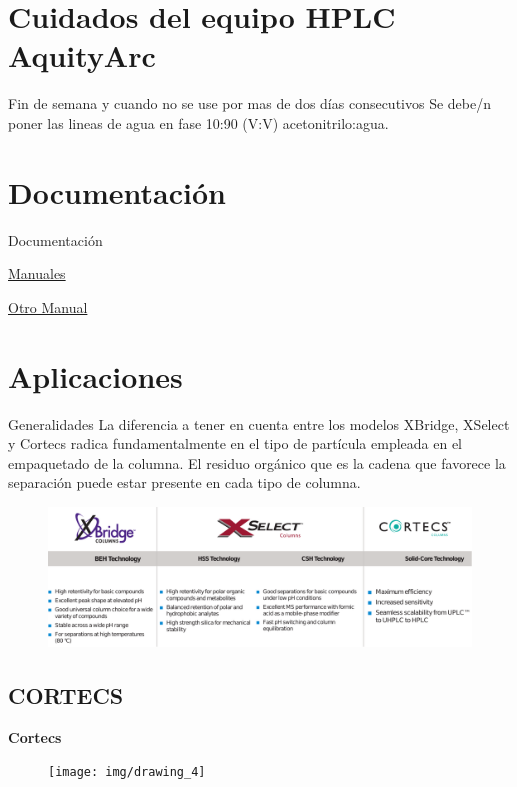 \documentclass[11pt]{beamer}
\begin{document}
    \section{Cuidados del equipo HPLC AquityArc}
      \begin{frame}{Fin de semana y cuando no se use por mas de dos días consecutivos}
          Se debe/n poner las lineas de agua en fase 10:90 (V:V) acetonitrilo:agua.
      \end{frame}

    \section{Documentación}
      \begin{frame}{Documentación}

        \href{https://www.manualsdir.com/brands/waters/129.html}{Manuales}

        \href{https://www.waters.com/waters/support.htm?locale=es\_EC\&lid=134658708\&cid=511442\&type=USRM}{Otro Manual}


      \end{frame}
    \section{Aplicaciones}
      \begin{frame}{Generalidades}
          La diferencia a tener en cuenta entre los modelos XBridge, XSelect y Cortecs radica fundamentalmente en el tipo de partícula empleada en el empaquetado de la columna. El residuo orgánico que es la cadena que favorece la separación puede estar presente en cada tipo de columna.
          \begin{figure}
              \centering
              \includegraphics[width=1\linewidth]{img/drawing_3}
              \label{fig:drawing3}
          \end{figure}
      \end{frame}



      \subsection{CORTECS}
        \begin{frame}{}
            \begin{center}
                \textbf{\LARGE Cortecs}
            \end{center}
            \begin{figure}
                \centering
                \texttt{[image: img/drawing\_4]}
                \label{fig:drawing4}
            \end{figure}

        \end{frame}
\end{document}
